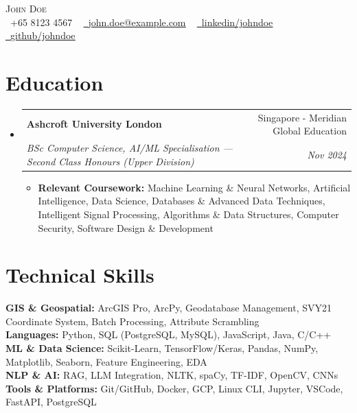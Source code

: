 \documentclass[letterpaper,10pt]{article}
\makeatletter
\newcommand{\resumeItem}[1]{\item\small{{#1\vspace{-3pt}}}}
\newcommand{\resumeSubheading}[4]{
  \vspace{-1pt}\item
    \begin{tabular*}{0.98\textwidth}[t]{l@{\extracolsep{\fill}}r}
      \textbf{#1} & #2 \\
      \textit{\small#3} & \textit{\small #4} \\
    \end{tabular*}\vspace{-5pt}
}
\newcommand{\resumeSubHeadingListStart}{\begin{itemize}[leftmargin=0.05in, rightmargin=0in, label={}]}
\newcommand{\resumeSubHeadingListEnd}{\end{itemize}}
\newcommand{\resumeItemListStart}{\begin{itemize}[leftmargin=0.15in, rightmargin=0.05in]\vspace{-2pt}}
\newcommand{\resumeItemListEnd}{\end{itemize}\vspace{-6pt}}
\makeatother
\begin{document}
\begin{center}
    {\huge \scshape John Doe} \\ \vspace{5.0pt}\small
 \raisebox{-0.1\height} \faPhone\ +65 8123 4567 ~
 \href{mailto:john.doe@example.com}
 {\raisebox{-0.1\height}\faEnvelopeO\  \underline{john.doe@example.com}} ~
\href{https://linkedin.com/in/johndoe/}{\raisebox{-0.1\height}\faLinkedinSquare\ \underline{linkedin/johndoe}} ~
\href{https://github.com/johndoe}{\raisebox{-0.1\height}\faGithub\ \underline{github/johndoe}} ~
\end{center}

\section{Education}
  \resumeSubHeadingListStart
    \resumeSubheading
      {Ashcroft University London}{Singapore - Meridian Global Education}
      {BSc Computer Science, AI/ML Specialisation \textnormal{---} Second Class Honours (Upper Division)}{Nov 2024}
      \resumeItemListStart
      \vspace{2pt}
        \resumeItem{\textbf{Relevant Coursework:} Machine Learning \& Neural Networks, Artificial Intelligence, Data Science, Databases \& Advanced Data Techniques, Intelligent Signal Processing, Algorithms \& Data Structures, Computer Security, Software Design \& Development}
      \resumeItemListEnd
  \resumeSubHeadingListEnd

\section{Technical Skills}
 \begin{itemize}[leftmargin=0.05in, label={}]
    \small{\item{
     \textbf{GIS \& Geospatial:}{ ArcGIS Pro, ArcPy, Geodatabase Management, SVY21 Coordinate System, Batch Processing, Attribute Scrambling} \\
     \textbf{Languages:}{ Python, SQL (PostgreSQL, MySQL), JavaScript, Java, C/C++} \\
     \textbf{ML \& Data Science:}{ Scikit-Learn, TensorFlow/Keras, Pandas, NumPy, Matplotlib, Seaborn, Feature Engineering, EDA} \\
     \textbf{NLP \& AI:}{ RAG, LLM Integration, NLTK, spaCy, TF-IDF, OpenCV, CNNs} \\
     \textbf{Tools \& Platforms:}{ Git/GitHub, Docker, GCP, Linux CLI, Jupyter, VSCode, FastAPI, PostgreSQL}}}
     \vspace{-4pt}
  \end{itemize}
\end{document}
